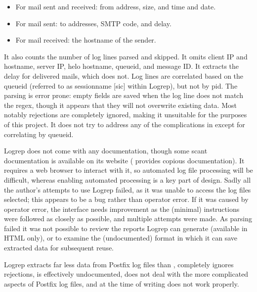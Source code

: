 \begin{itemize}

    \item For mail sent and received: from address, size, and time and
        date.

    \item For mail sent: to addresses, \gls{SMTP} code, and delay.

    \item For mail received: the hostname of the sender.

\end{itemize}

It also counts the number of log lines parsed and skipped.  It omits client
\gls{IP} and hostname, server \gls{IP}, helo hostname, queueid, and message
ID\@.  It extracts the delay for delivered mails, which \parsername{} does
not.  Log lines are correlated based on the queueid (referred to as
sessionname [sic] within Logrep), but not by \gls{pid}.  The parsing is
error prone: empty fields are saved when the log line does not match the
regex, though it appears that they will not overwrite existing data.  Most
notably rejections are completely ignored, making it unsuitable for the
purposes of this project.  It does not try to address any of the
complications in  except for correlating by
queueid.

Logrep does not come with any documentation, though some scant
documentation is available on its website (\parsername{} provides copious
documentation).  It requires a web browser to interact with it, so
automated log file processing will be difficult, whereas enabling automated
processing is a key part of \parsernames{} design.  Sadly all the author's
attempts to use Logrep failed, as it was unable to access the log files
selected; this appears to be a bug rather than operator error.  If it was
caused by operator error, the interface needs improvement as the (minimal)
instructions were followed as closely as possible, and multiple attempts
were made.  As parsing failed it was not possible to review the reports
Logrep can generate (available in HTML only), or to examine the
(undocumented) format in which it can save extracted data for subsequent
reuse.

Logrep extracts far less data from Postfix log files than \parsername{},
completely ignores rejections, is effectively undocumented, does not deal
with the more complicated aspects of Postfix log files, and at the time of
writing does not work properly.

